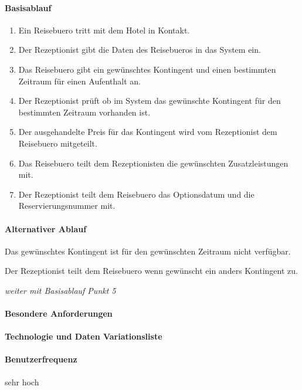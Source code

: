 \paragraph{Basisablauf}
\begin{enumerate}
	\item Ein \Gls{Reisebuero} tritt mit dem Hotel in Kontakt.
	\item Der \Gls{Rezeptionist} gibt die Daten des \Gls{Reisebuero}s in das System ein.
	\item Das \Gls{Reisebuero} gibt ein gewünschtes Kontingent und einen bestimmten Zeitraum für einen Aufenthalt an. 
    \item Der \Gls{Rezeptionist} prüft ob im System das gewünschte Kontingent für den bestimmten Zeitraum vorhanden ist. 
	\item Der ausgehandelte Preis für das Kontingent wird vom \Gls{Rezeptionist} dem \Gls{Reisebuero} mitgeteilt.
	\item Das \Gls{Reisebuero} teilt dem \Gls{Rezeptionist}en die gewünschten Zusatzleistungen mit.
	\item Der \Gls{Rezeptionist} teilt dem \Gls{Reisebuero} das Optionsdatum und die Reservierungsnummer mit.
\end{enumerate}

\paragraph{Alternativer Ablauf}
\begin{longenum}
	\item
	\item
	\item
	\item
	\begin{longenum}
		\item Das gewünschtes Kontingent ist für den gewünschten Zeitraum nicht verfügbar.
		\begin{longenum}
			\item Der \Gls{Rezeptionist} teilt dem \Gls{Reisebuero} wenn gewünscht ein anders Kontingent zu.
			\item \emph{weiter mit Basisablauf Punkt 5}
		\end{longenum}
	\end{longenum}
	\item
	\item
	\item
\end{longenum}

\paragraph{Besondere Anforderungen}

\paragraph{Technologie und Daten Variationsliste}

\paragraph{Benutzerfrequenz}
sehr hoch

\newpage


